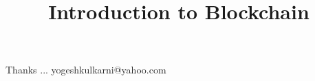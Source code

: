 \documentclass[xcolor=dvipsnames,compress,t,pdf,9pt]{beamer}
\title[\insertframenumber /\inserttotalframenumber]{Introduction to Blockchain}
\begin{document}
	\begin{frame}
	\titlepage
%
	\end{frame}
	
%	
	
	
	\begin{frame}[c]{}
	Thanks ...
	\vspace{5mm}
	yogeshkulkarni@yahoo.com
	\end{frame}
\end{document}
